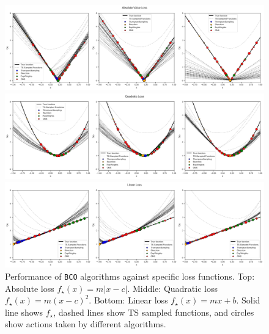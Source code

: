 \documentclass[letter, 12pt]{report}
\newcommand{\1}{\mathbf{1}}
\newcommand{\bco}{\texttt{BCO}\xspace}
\newcommand{\ts}{\textsc{TS}\xspace}
\theoremstyle{plain}
\theoremstyle{definition}
\theoremstyle{remark}
\begin{document}
\begin{figure}[h!]
    \centering
    \includegraphics[width=\textwidth]{figures/absolute.png}

    \vspace{0.5em}
    \includegraphics[width=\textwidth]{figures/quadratic.png}

    \vspace{0.5em}
    \includegraphics[width=\textwidth]{figures/linear.png}

    \caption{
        Performance of \bco algorithms against specific loss functions.
        Top: Absolute loss $f_\star(x) = m|x - c|$.
        Middle: Quadratic loss $f_\star(x) = m(x - c)^2$.
        Bottom: Linear loss $f_\star(x) = mx + b$.
        Solid line shows $f_\star$, dashed lines show \ts sampled functions,
        and circles show actions taken by different algorithms.
    }
    \label{fig:specific-losses}
\end{figure}
\end{document}
